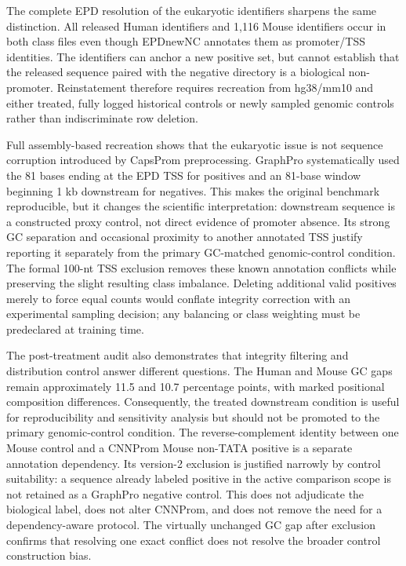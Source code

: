 The complete EPD resolution of the eukaryotic identifiers sharpens the same
distinction. All released Human identifiers and 1,116 Mouse identifiers occur
in both class files even though EPDnewNC annotates them as promoter/TSS
identities. The identifiers can anchor a new positive set, but cannot establish
that the released sequence paired with the negative directory is a biological
non-promoter. Reinstatement therefore requires recreation from hg38/mm10 and
either treated, fully logged historical controls or newly sampled genomic
controls rather than indiscriminate row deletion.

Full assembly-based recreation shows that the eukaryotic issue is not sequence
corruption introduced by CapsProm preprocessing. GraphPro systematically used
the 81 bases ending at the EPD TSS for positives and an 81-base window beginning
1 kb downstream for negatives. This makes the original benchmark reproducible,
but it changes the scientific interpretation: downstream sequence is a
constructed proxy control, not direct evidence of promoter absence. Its strong
GC separation and occasional proximity to another annotated TSS justify
reporting it separately from the primary GC-matched genomic-control condition.
The formal 100-nt TSS exclusion removes these known annotation conflicts while
preserving the slight resulting class imbalance. Deleting additional valid
positives merely to force equal counts would conflate integrity correction with
an experimental sampling decision; any balancing or class weighting must be
predeclared at training time.

The post-treatment audit also demonstrates that integrity filtering and
distribution control answer different questions. The Human and Mouse GC gaps
remain approximately 11.5 and 10.7 percentage points, with marked positional
composition differences. Consequently, the treated downstream condition is
useful for reproducibility and sensitivity analysis but should not be promoted
to the primary genomic-control condition. The reverse-complement identity
between one Mouse control and a CNNProm Mouse non-TATA positive is a separate
annotation dependency. Its version-2 exclusion is justified narrowly by control
suitability: a sequence already labeled positive in the active comparison scope
is not retained as a GraphPro negative control. This does not adjudicate the
biological label, does not alter CNNProm, and does not remove the need for a
dependency-aware protocol. The virtually unchanged GC gap after exclusion
confirms that resolving one exact conflict does not resolve the broader control
construction bias.

